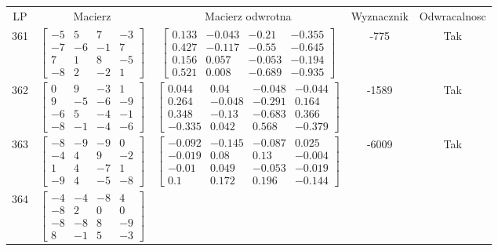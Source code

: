 \documentclass[a4paper,12pt]{article}
\begin{document}
\bgroup {} \vspace{0.2in} \begin{tabular}{c c c c c}
LP & Macierz & Macierz odwrotna & Wyznacznik & Odwracalnosc\\
361
&
$\begin{bmatrix} -5 & 5 & 7 & -3 \\ -7 & -6 & -1 & 7 \\ 7 & 1 & 8 & -5 \\ -8 & 2 & -2 & 1 \end{bmatrix}$
&
$\begin{bmatrix} 0.133 & -0.043 & -0.21 & -0.355 \\ 0.427 & -0.117 & -0.55 & -0.645 \\ 0.156 & 0.057 & -0.053 & -0.194 \\ 0.521 & 0.008 & -0.689 & -0.935 \end{bmatrix}$
&
-775
&
Tak
\\
362
&
$\begin{bmatrix} 0 & 9 & -3 & 1 \\ 9 & -5 & -6 & -9 \\ -6 & 5 & -4 & -1 \\ -8 & -1 & -4 & -6 \end{bmatrix}$
&
$\begin{bmatrix} 0.044 & 0.04 & -0.048 & -0.044 \\ 0.264 & -0.048 & -0.291 & 0.164 \\ 0.348 & -0.13 & -0.683 & 0.366 \\ -0.335 & 0.042 & 0.568 & -0.379 \end{bmatrix}$
&
-1589
&
Tak
\\
363
&
$\begin{bmatrix} -8 & -9 & -9 & 0 \\ -4 & 4 & 9 & -2 \\ 1 & 4 & -7 & 1 \\ -9 & 4 & -5 & -8 \end{bmatrix}$
&
$\begin{bmatrix} -0.092 & -0.145 & -0.087 & 0.025 \\ -0.019 & 0.08 & 0.13 & -0.004 \\ -0.01 & 0.049 & -0.053 & -0.019 \\ 0.1 & 0.172 & 0.196 & -0.144 \end{bmatrix}$
&
-6009
&
Tak
\\
364
&
$\begin{bmatrix} -4 & -4 & -8 & 4 \\ -8 & 2 & 0 & 0 \\ -8 & -8 & 8 & -9 \\ 8 & -1 & 5 & -3 \end{bmatrix}$

\end{tabular}
\end{document}
